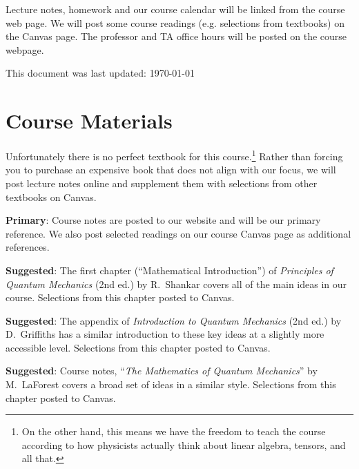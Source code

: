 \documentclass[12pt]{article}
\newcommand\acro[1]{{\small {#1}}}
\numberwithin{equation}{section}    %
\begin{document}
\vspace{.5em}
\noindent Lecture notes, homework and our course calendar will be linked from the course web page. We will post some course readings (e.g. selections from textbooks) on the Canvas page.
%
The professor and \acro{TA} office hours will be posted on the course webpage. 

\vspace{.5em}
\noindent This document was last updated: \today


\section{Course Materials}

Unfortunately there is no perfect textbook for this course.\footnote{On the other hand, this means we have the freedom to teach the course according to how physicists actually think about linear algebra, tensors, and all that.} Rather than forcing you to purchase an expensive book that does not align with our focus, we will post lecture notes online and supplement them with selections from other textbooks on Canvas.
\vspace{.5em}


\noindent\textbf{Primary}: Course notes are posted to our website and will be our primary reference. We also post selected readings on our course Canvas page as additional references. 
\vspace{.5em}

\noindent\textbf{Suggested}: The first chapter (``Mathematical Introduction'') of \emph{Principles of Quantum Mechanics} (2nd ed.)  by R.~Shankar covers all of the main ideas in our course. Selections from this chapter posted to Canvas.
\vspace{.5em}

\noindent\textbf{Suggested}: The appendix of \emph{Introduction to Quantum Mechanics} (2nd ed.)  by D.~Griffiths has a similar introduction to these key ideas at a slightly more accessible level. Selections from this chapter posted to Canvas.
\vspace{.5em}

\noindent\textbf{Suggested}: Course notes, ``\emph{The Mathematics of Quantum Mechanics}'' by M.~LaForest covers a broad set of ideas in a similar style. Selections from this chapter posted to Canvas.
\vspace{.5em}
\end{document}
